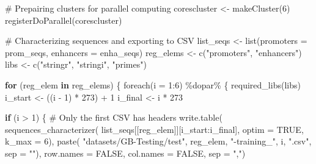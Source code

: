 \documentclass[
  letterpaper,
]{article}
\newenvironment{Shaded}{\begin{snugshade}}{\end{snugshade}}
\newcommand{\AttributeTok}[1]{\textcolor[rgb]{0.40,0.45,0.13}{#1}}
\newcommand{\CommentTok}[1]{\textcolor[rgb]{0.37,0.37,0.37}{#1}}
\newcommand{\ConstantTok}[1]{\textcolor[rgb]{0.56,0.35,0.01}{#1}}
\newcommand{\ControlFlowTok}[1]{\textcolor[rgb]{0.00,0.23,0.31}{\textbf{#1}}}
\newcommand{\DecValTok}[1]{\textcolor[rgb]{0.68,0.00,0.00}{#1}}
\newcommand{\FunctionTok}[1]{\textcolor[rgb]{0.28,0.35,0.67}{#1}}
\newcommand{\NormalTok}[1]{\textcolor[rgb]{0.00,0.23,0.31}{#1}}
\newcommand{\OtherTok}[1]{\textcolor[rgb]{0.00,0.23,0.31}{#1}}
\newcommand{\SpecialCharTok}[1]{\textcolor[rgb]{0.37,0.37,0.37}{#1}}
\newcommand{\StringTok}[1]{\textcolor[rgb]{0.13,0.47,0.30}{#1}}
\begin{document}
\begin{Shaded}
\begin{Highlighting}[]
\CommentTok{\# Prepairing clusters for parallel computing}
\NormalTok{corescluster }\OtherTok{\textless{}{-}} \FunctionTok{makeCluster}\NormalTok{(}\DecValTok{6}\NormalTok{)}
\FunctionTok{registerDoParallel}\NormalTok{(corescluster)}

\CommentTok{\# Characterizing sequences and exporting to CSV}
\NormalTok{list\_seqs }\OtherTok{\textless{}{-}} \FunctionTok{list}\NormalTok{(}\AttributeTok{promoters =}\NormalTok{ prom\_seqs,}
                  \AttributeTok{enhancers =}\NormalTok{ enha\_seqs)}
\NormalTok{reg\_elems }\OtherTok{\textless{}{-}} \FunctionTok{c}\NormalTok{(}\StringTok{"promoters"}\NormalTok{, }\StringTok{"enhancers"}\NormalTok{)}
\NormalTok{libs }\OtherTok{\textless{}{-}} \FunctionTok{c}\NormalTok{(}\StringTok{"stringr"}\NormalTok{, }\StringTok{"stringi"}\NormalTok{, }\StringTok{"primes"}\NormalTok{)}

\ControlFlowTok{for}\NormalTok{ (reg\_elem }\ControlFlowTok{in}\NormalTok{ reg\_elems) \{}
  \FunctionTok{foreach}\NormalTok{(}\AttributeTok{i =} \DecValTok{1}\SpecialCharTok{:}\DecValTok{6}\NormalTok{) }\SpecialCharTok{\%dopar\%}\NormalTok{ \{}
    \FunctionTok{required\_libs}\NormalTok{(libs)}
\NormalTok{    i\_start }\OtherTok{\textless{}{-}}\NormalTok{ ((i }\SpecialCharTok{{-}} \DecValTok{1}\NormalTok{) }\SpecialCharTok{*} \DecValTok{273}\NormalTok{) }\SpecialCharTok{+} \DecValTok{1}
\NormalTok{    i\_final }\OtherTok{\textless{}{-}}\NormalTok{ i }\SpecialCharTok{*} \DecValTok{273}

    \ControlFlowTok{if}\NormalTok{ (i }\SpecialCharTok{\textgreater{}} \DecValTok{1}\NormalTok{) \{ }\CommentTok{\# Only the first CSV has headers}
      \FunctionTok{write.table}\NormalTok{(}
        \FunctionTok{sequences\_characterizer}\NormalTok{(}
\NormalTok{          list\_seqs[[reg\_elem]][i\_start}\SpecialCharTok{:}\NormalTok{i\_final],}
          \AttributeTok{optim =} \ConstantTok{TRUE}\NormalTok{, }\AttributeTok{k\_max =} \DecValTok{6}\NormalTok{),}
        \FunctionTok{paste}\NormalTok{(}
          \StringTok{"datasets/GB{-}Testing/test"}\NormalTok{, reg\_elem, }
          \StringTok{"{-}training\_"}\NormalTok{, i, }\StringTok{".csv"}\NormalTok{, }\AttributeTok{sep =} \StringTok{""}\NormalTok{), }
          \AttributeTok{row.names =} \ConstantTok{FALSE}\NormalTok{, }\AttributeTok{col.names =} \ConstantTok{FALSE}\NormalTok{,}
          \AttributeTok{sep =} \StringTok{","}\NormalTok{)}


\end{Highlighting}
\end{Shaded}
\end{document}
